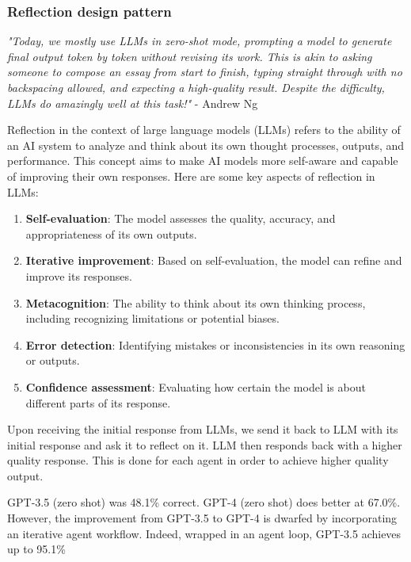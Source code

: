 

\subsubsection{Reflection design pattern}
\textit{"Today, we mostly use LLMs in zero-shot mode, prompting a model to generate final output token by token without revising its work. This is akin to asking someone to compose an essay from start to finish, typing straight through with no backspacing allowed, and expecting a high-quality result. Despite the difficulty, LLMs do amazingly well at this task!"} - Andrew Ng \cite{deeplearningFourAgent}

Reflection in the context of large language models (LLMs) refers to the ability of an AI system to analyze and think about its own thought processes, outputs, and performance. This concept aims to make AI models more self-aware and capable of improving their own responses. \cite{shinn2023reflexionlanguageagentsverbal}  \cite{madaan2023selfrefineiterativerefinementselffeedback} Here are some key aspects of reflection in LLMs:

\begin{enumerate}
    \item \textbf{Self-evaluation}: The model assesses the quality, accuracy, and appropriateness of its own outputs.
    \item \textbf{Iterative improvement}: Based on self-evaluation, the model can refine and improve its responses.
    \item \textbf{Metacognition}: The ability to think about its own thinking process, including recognizing limitations or potential biases.
    \item \textbf{Error detection}: Identifying mistakes or inconsistencies in its own reasoning or outputs.
    \item \textbf{Confidence assessment}: Evaluating how certain the model is about different parts of its response.
\end{enumerate}

Upon receiving the initial response from LLMs, we send it back to LLM with its initial response and ask it to reflect on it. LLM then responds back with a higher quality response. This is done for each agent in order to achieve higher quality output.

GPT-3.5 (zero shot) was 48.1\% correct. GPT-4 (zero shot) does better at 67.0\%. However, the improvement from GPT-3.5 to GPT-4 is dwarfed by incorporating an iterative agent workflow. Indeed, wrapped in an agent loop, GPT-3.5 achieves up to 95.1\% \cite{deeplearningFourAgent}


